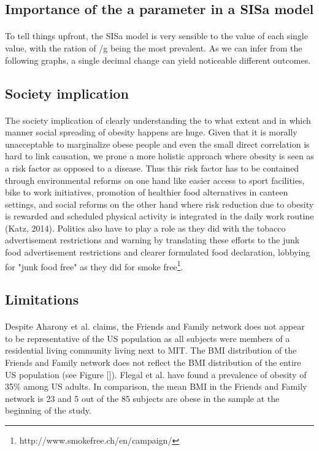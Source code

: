 \documentclass[11pt]{article}
\begin{document}
\subsection{Importance of the a parameter in a SISa model}
\paragraph{}
To tell things upfront, the SISa model is very sensible to the value of each single value, with the ration of \beta  \] /g being the most prevalent. As we can infer from the following graphs, a single decimal change can yield noticeable different outcomes.



\subsection{Society implication}
\paragraph{}
The society implication of clearly understanding the to what extent and in which manner social spreading of obesity happens are huge. Given that it is morally unacceptable to marginalize obese people and even the small direct correlation is hard to link causation, we prone a more holistic approach where obesity is seen as a risk factor as opposed to a disease. Thus this risk factor has to be contained through environmental reforms on one hand like easier access to sport facilities, bike to work initiatives, promotion of healthier food alternatives in canteen settings, and social reforms on the other hand where risk reduction due to obesity is rewarded and scheduled physical activity is integrated in the daily work routine (Katz, 2014). Politics also have to play a role as they did with the tobacco advertisement restrictions and warning by translating these efforts to the junk food advertisement restrictions and clearer formulated food declaration, lobbying for "junk food free" as they did for smoke free\footnote{http://www.smokefree.ch/en/campaign/}.

\subsection{Limitations}
\paragraph{}
Despite Aharony et al. claims, the Friends and Family network does not appear to be representative of the US population as all subjects were members of a residential living community living next to MIT. The BMI distribution of the Friends and Family network does not reflect the BMI distribution of the entire US population (see Figure []). Flegal et al. have found a prevalence of obesity of 35\% among US adults. In comparison, the mean BMI in the Friends and Family network is 23 and 5 out of the 85 subjects are obese in the sample at the beginning of the study.
\end{document}
